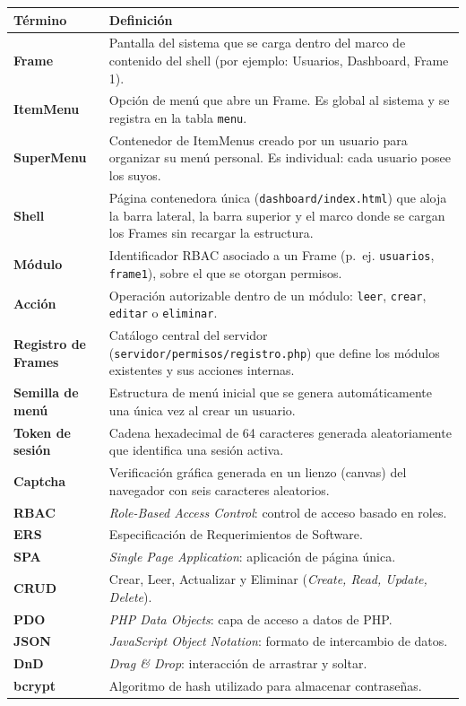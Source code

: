 \begin{longtable}{|>{\bfseries}p{3.6cm}|p{11cm}|}
\hline
\rowcolor{azulcorp!15} \textbf{Término} & \textbf{Definición} \\ \hline
\endhead
Frame & Pantalla del sistema que se carga dentro del marco de contenido del
        shell (por ejemplo: Usuarios, Dashboard, Frame 1). \\ \hline
ItemMenu & Opción de menú que abre un Frame. Es global al sistema y se
        registra en la tabla \texttt{menu}. \\ \hline
SuperMenu & Contenedor de ItemMenus creado por un usuario para organizar su
        menú personal. Es individual: cada usuario posee los suyos. \\ \hline
Shell & Página contenedora única (\texttt{dashboard/index.html}) que aloja la
        barra lateral, la barra superior y el marco donde se cargan los
        Frames sin recargar la estructura. \\ \hline
Módulo & Identificador RBAC asociado a un Frame (p.~ej. \texttt{usuarios},
        \texttt{frame1}), sobre el que se otorgan permisos. \\ \hline
Acción & Operación autorizable dentro de un módulo: \texttt{leer},
        \texttt{crear}, \texttt{editar} o \texttt{eliminar}. \\ \hline
Registro de Frames & Catálogo central del servidor
        (\texttt{servidor/permisos/registro.php}) que define los módulos
        existentes y sus acciones internas. \\ \hline
Semilla de menú & Estructura de menú inicial que se genera automáticamente
        una única vez al crear un usuario. \\ \hline
Token de sesión & Cadena hexadecimal de 64 caracteres generada
        aleatoriamente que identifica una sesión activa. \\ \hline
Captcha & Verificación gráfica generada en un lienzo (canvas) del navegador
        con seis caracteres aleatorios. \\ \hline
RBAC & \textit{Role-Based Access Control}: control de acceso basado en roles. \\ \hline
ERS & Especificación de Requerimientos de Software. \\ \hline
SPA & \textit{Single Page Application}: aplicación de página única. \\ \hline
CRUD & Crear, Leer, Actualizar y Eliminar (\textit{Create, Read, Update,
        Delete}). \\ \hline
PDO & \textit{PHP Data Objects}: capa de acceso a datos de PHP. \\ \hline
JSON & \textit{JavaScript Object Notation}: formato de intercambio de datos. \\ \hline
DnD & \textit{Drag \& Drop}: interacción de arrastrar y soltar. \\ \hline
bcrypt & Algoritmo de hash utilizado para almacenar contraseñas. \\ \hline
\end{longtable}

